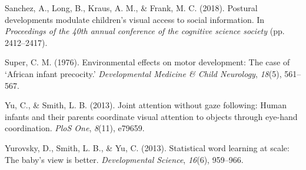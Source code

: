 \documentclass[10pt, letterpaper]{article}
\newenvironment{CSLReferences}%
  {}%
  {\par}
\begin{document}
\begin{CSLReferences}{1}{0}
\leavevmode\hypertarget{ref-sanchez2018detecting}{}%
Sanchez, A., Long, B., Kraus, A. M., \& Frank, M. C. (2018). Postural
developments modulate children's visual access to social information. In
\emph{Proceedings of the 40th annual conference of the cognitive science
society} (pp. 2412--2417).

\leavevmode\hypertarget{ref-super1976environmental}{}%
Super, C. M. (1976). Environmental effects on motor development: The
case of {`{A}frican infant precocity.'} \emph{Developmental Medicine \&
Child Neurology}, \emph{18}(5), 561--567.

\leavevmode\hypertarget{ref-yu2013joint}{}%
Yu, C., \& Smith, L. B. (2013). Joint attention without gaze following:
Human infants and their parents coordinate visual attention to objects
through eye-hand coordination. \emph{PloS One}, \emph{8}(11), e79659.

\leavevmode\hypertarget{ref-yurovsky2013statistical}{}%
Yurovsky, D., Smith, L. B., \& Yu, C. (2013). Statistical word learning
at scale: The baby's view is better. \emph{Developmental Science},
\emph{16}(6), 959--966.

\end{CSLReferences}


\end{document}

